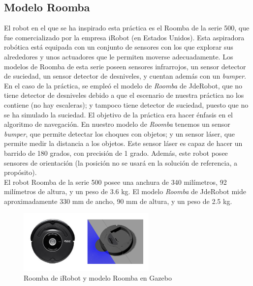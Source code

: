 \subsection{Modelo Roomba}
El robot en el que se ha inspirado esta práctica es el Roomba de la serie 500, que fue comercializado por la empresa iRobot (en Estados Unidos). Esta aspiradora robótica está equipada con un conjunto de sensores con los que explorar sus alrededores y unos actuadores que le permiten moverse adecuadamente. Los modelos de Roomba de esta serie poseen sensores infrarrojos, un sensor detector de suciedad, un sensor detector de desniveles, y cuentan además con un \textit{bumper}.\\

En el caso de la práctica, se empleó el modelo de \textit{Roomba} de JdeRobot, que no tiene detector de desniveles debido a que el escenario de nuestra práctica no los contiene (no hay escaleras); y tampoco tiene detector de suciedad, puesto que no se ha simulado la suciedad. El objetivo de la práctica era hacer énfasis en el algoritmo de navegación. En nuestro modelo de \textit{Roomba} tenemos un sensor \textit{bumper}, que permite detectar los choques con objetos; y un sensor láser, que permite medir la distancia a los objetos. Este sensor láser es capaz de hacer un barrido de 180 grados, con precisión de 1 grado. Además, este robot posee sensores de orientación (la posición no se usará en la solución de referencia, a propósito).\\

El robot Roomba de la serie 500 posee una anchura de 340 milímetros, 92 milímetros de altura, y un peso de 3.6 kg. El modelo \textit{Roomba} de JdeRobot mide aproximadamente 330 mm de ancho, 90 mm de altura, y un peso de 2.5 kg.\\

\begin{figure}[H]
  \begin{center}
    \includegraphics[width=0.6\textwidth]{figures/Vacuum/Roombas.png}
		\caption{Roomba de iRobot y modelo Roomba en Gazebo}
		\label{fig.roombas}
		\end{center}
\end{figure}

